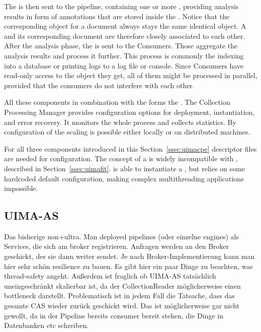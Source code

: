 The \cas{} is then sent to the pipeline, containing one or more \anens{}, providing analysis results in form of annotations that are stored inside the \cas{}. Notice that the corresponding \cas{} object for a document always stays the same identical object. A \cas{} and its corresponding document are therefore closely associated to each other. After the analysis phase, the \cas{} is sent to the \cas{} Consumers. Those aggregate the analysis results and process it further. This process is commonly the indexing into a database or printing logs to a log file or console. Since \cas{} Consumers have read-only access to the \cas{} object they get, all of them might be processed in parallel, provided that the consumers do not interfere with each other.

All these components in combination with the \uima{} \cpm{} forms the \uimacpe{}. The Collection Processing Manager provides configuration options for deployment, instantiation, and error recovery. It monitors the whole process and collects statistics. By configuration of the \cpm{} scaling is possible either locally or on distributed machines.

For all three components introduced in this Section~\ref{ssec:uimacpe} \xml{} descriptor files are needed for configuration. The concept of a \uimacpe{} is widely incompatible with \uimafit{}, described in Section~\ref{ssec:uimafit}. \uimafit{} is able to instantiate a \cpe{}, but relies on some hardcoded default configuration, making complex multithreading applications impossible.


\subsection{UIMA-AS}
\label{ssec:uimaas}
Das bisherige non+ultra. Man deployed pipelines (oder einzelne engines) als Services, die sich am broker registrieren. Anfragen werden an den Broker geschickt, der sie dann weiter sendet. Je nach Broker-Implementierung kann man hier sehr schön resilience zu bauen. Es gibt hier ein paar Dinge zu beachten, was thread-safety angeht. Außerdem ist fraglich ob UIMA-AS tatsächlich uneingeschränkt skalierbar ist, da der CollectionReader möglicherweise einen bottleneck darstellt. Problematisch ist in jedem Fall die Tatsache, dass das gesamte CAS wieder zurück geschickt wird. Das ist möglicherweise gar nicht gewollt, da in der Pipeline bereits consumer bereit stehen, die Dinge in Datenbanken etc schreiben.

